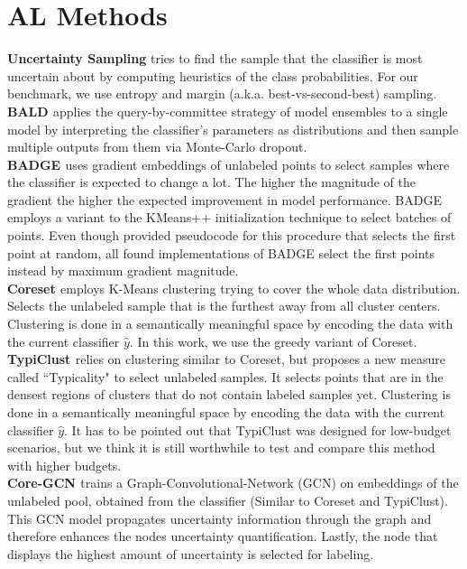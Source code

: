 \documentclass[]{article}
\begin{document}
\section{AL Methods}\label{app:acquisition_functions}
\textbf{Uncertainty Sampling} 
tries to find the sample that the classifier is most uncertain about by computing heuristics of the class probabilities. For our benchmark, we use entropy and margin (a.k.a. best-vs-second-best) sampling.\\
\textbf{BALD \cite{kirsch2019batchbald}}
applies the query-by-committee strategy of model ensembles to a single model by interpreting the classifier's parameters as distributions and then sample multiple outputs from them via Monte-Carlo dropout.\\
\textbf{BADGE \cite{ashdeep}} uses gradient embeddings of unlabeled points to select samples where the classifier is expected to change a lot. The higher the magnitude of the gradient the higher the expected improvement in model performance.
BADGE employs a variant to the KMeans++ initialization technique to select batches of points. Even though \cite{ashdeep} provided pseudocode for this procedure that selects the first point at random, all found implementations of BADGE select the first points instead by maximum gradient magnitude. \\
\textbf{Coreset \cite{sener2017active}}
employs K-Means clustering trying to cover the whole data distribution.
Selects the unlabeled sample that is the furthest away from all cluster centers.
Clustering is done in a semantically meaningful space by encoding the data with the current classifier $\hat y$.
In this work, we use the greedy variant of Coreset.\\
\textbf{TypiClust \cite{hacohen2022active}}
relies on clustering similar to Coreset, but proposes a new measure called ``Typicality" to select unlabeled samples.
It selects points that are in the densest regions of clusters that do not contain labeled samples yet.
Clustering is done in a semantically meaningful space by encoding the data with the current classifier $\hat y$.
It has to be pointed out that TypiClust was designed for low-budget scenarios, but we think it is still worthwhile to test and compare this method with higher budgets. \\
\textbf{Core-GCN \cite{caramalau2021sequential}} trains a Graph-Convolutional-Network (GCN) on embeddings of the unlabeled pool, obtained from the classifier (Similar to Coreset and TypiClust). 
This GCN model propagates uncertainty information through the graph and therefore enhances the nodes uncertainty quantification. Lastly, the node that displays the highest amount of uncertainty is selected for labeling. \\
\end{document}
